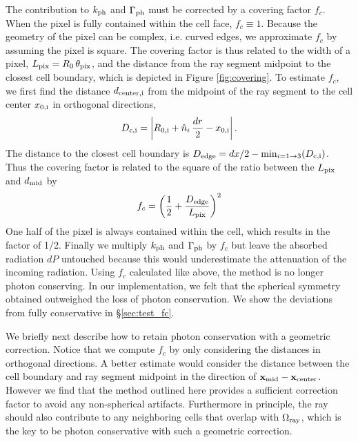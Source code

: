 \documentclass[apj,onecolumn]{emulateapj}
\begin{document}
The contribution to $k_{\rm ph}$ and $\Gamma_{\rm ph}$ must be
corrected by a covering factor $f_c$.  When the pixel is fully
contained within the cell face, $f_c \equiv 1$.  Because the geometry
of the pixel can be complex, i.e. curved edges, we approximate $f_c$
by assuming the pixel is square.  The covering factor is thus related
to the width of a pixel, $L_{\rm pix} = R_0 \, \theta_{\rm pix}$, and
the distance from the ray segment midpoint to the closest cell
boundary, which is depicted in Figure \ref{fig:covering}.  To estimate
$f_c$, we first find the distance $d_{\rm center,i}$ from the midpoint
of the ray segment to the cell center $x_{\rm 0,i}$ in orthogonal
directions,
%
\begin{equation}
  \label{eqn:midpoint}
  D_{\rm c,i} = \left| R_{\rm 0,i} + \hat{n}_i\,\frac{dr}{2} - x_{\rm
      0,i} \right|.
\end{equation}
The distance to the closest cell boundary is $D_{\rm edge} = dx/2 -
\min_{i=1 \rightarrow 3} (D_{\rm c,i})$.  Thus the covering
factor is related to the square of the ratio between the $L_{\rm pix}$
and $d_{\rm mid}$ by
%
\begin{equation}
  \label{eqn:fc}
  f_c = \left( \frac{1}{2} + \frac{D_{\rm edge}}{L_{\rm pix}} \right)^2
\end{equation}
One half of the pixel is always contained within the cell, which
results in the factor of 1/2.  Finally we multiply $k_{\rm ph}$ and
$\Gamma_{\rm ph}$ by $f_c$ but leave the absorbed radiation $dP$
untouched because this would underestimate the attenuation of the
incoming radiation.  Using $f_c$ calculated like above, the method is
no longer photon conserving.  In our implementation, we felt that the
spherical symmetry obtained outweighed the loss of photon
conservation.  We show the deviations from fully conservative in
\S\ref{sec:test_fc}.  

We briefly next describe how to retain photon conservation with a
geometric correction.  Notice that we compute $f_c$ by only
considering the distances in orthogonal directions.  A better estimate
would consider the distance between the cell boundary and ray segment
midpoint in the direction of $\mathbf{x}_{\rm mid} - \mathbf{x}_{\rm
  center}$.  However we find that the method outlined here provides a
sufficient correction factor to avoid any non-spherical artifacts.
Furthermore in principle, the ray should also contribute to any
neighboring cells that overlap with $\Omega_{\rm ray}$, which is the
key to be photon conservative with such a geometric correction.
\end{document}
